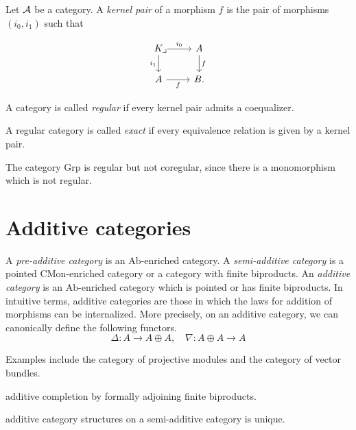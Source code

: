 \documentclass{../../large}
\begin{document}
\begin{prb}
Let $\mathcal{A}$ be a category.
A \emph{kernel pair} of a morphism $f$ is the pair of morphisms $(i_0,i_1)$ such that

\[\begin{tikzcd}[execute at end picture={\node[label={[below right]:$\lrcorner$}]at(\tikzcdmatrixname-1-1){};}]
K \rar{i_0}\dar[swap]{i_1} & A \dar{f} \\
A \rar[swap]{f} & B.
\end{tikzcd}\]
\end{prb}


A category is called \emph{regular} if every kernel pair admits a coequalizer.

\begin{prb}
A regular category is called \emph{exact} if every equivalence relation is given by a kernel pair.
\begin{parts}
\item
\end{parts}
\end{prb}

The category $\mathrm{Grp}$ is regular but not coregular, since there is a monomorphism which is not regular.








\section{Additive categories}



\begin{prb}
A \emph{pre-additive category} is an $\mathrm{Ab}$-enriched category.
A \emph{semi-additive category} is a pointed $\mathrm{CMon}$-enriched category or a category with finite biproducts.
An \emph{additive category} is an $\mathrm{Ab}$-enriched category which is pointed or has finite biproducts.
In intuitive terms, additive categories are those in which the laws for addition of morphisms can be internalized.
More precisely, on an additive category, we can canonically define the following functors.
\[\Delta:A\to A\oplus A,\quad\nabla:A\oplus A\to A\]

Examples include the category of projective modules and the category of vector bundles.
\begin{parts}
\item additive completion by formally adjoining finite biproducts.
\item additive category structures on a semi-additive category is unique.
\end{parts}
\end{prb}
\end{document}
